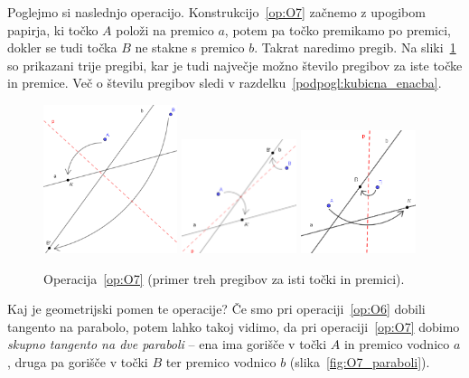 Poglejmo si naslednjo operacijo. Konstrukcijo~\ref{op:O7} začnemo z upogibom papirja, ki točko $A$ položi na premico $a$, potem pa točko premikamo po premici, dokler se tudi točka $B$ ne stakne s premico $b$. Takrat naredimo pregib. Na sliki~\ref{fig:O7} so prikazani trije pregibi, kar je tudi največje možno število pregibov za iste točke in premice. Več o številu pregibov sledi v razdelku~\ref{podpogl:kubicna_enacba}.

\begin{figure}[h]
    \centering
    \includegraphics[width=0.35\textwidth]{images/origami_operacije/O7b.png}
    \includegraphics[width=0.3\textwidth]{images/origami_operacije/O7a.png}
    \includegraphics[width=0.3\textwidth]{images/origami_operacije/O7c.png}
    \caption[Operacija~\ref{op:O7}]{Operacija~\ref{op:O7} (primer treh pregibov za isti točki in premici).}
    \label{fig:O7}
\end{figure}

Kaj je geometrijski pomen te operacije? Če smo pri operaciji~\ref{op:O6} dobili tangento na parabolo, potem lahko takoj vidimo, da pri operaciji~\ref{op:O7} dobimo \emph{skupno tangento na dve paraboli} -- ena ima gorišče v točki $A$ in premico vodnico $a$, druga pa gorišče v točki $B$ ter premico vodnico $b$ (slika~\ref{fig:O7_paraboli}).


